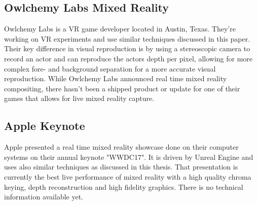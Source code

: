 \subsection{Owlchemy Labs Mixed Reality}

Owlchemy Labs is a VR game developer located in Austin, Texas. They're working 
on VR experiments and use similar techniques discussed in this paper. Their key 
difference in visual reproduction is by using a stereoscopic camera to record 
an actor and can reproduce the actors depth per pixel, allowing for more 
complex fore- and background separation for a more accurate visual reproduction.
\newline
While Owlchemy Labs announced real time mixed reality compositing, there hasn't 
been a shipped product or update for one of their games that allows for live 
mixed reality capture\cite{owlchemy:mr:3:2017}.

\subsection{Apple Keynote}

Apple presented a real time mixed reality showcase done on their computer 
systems on their annual keynote "WWDC17". It is driven by Unreal Engine and 
uses also similar techniques as discussed in this thesis. That presentation is 
currently the best live performance of mixed reality with a high quality chroma 
keying, depth reconstruction and high fidelity graphics. There is no technical 
information available yet\cite{ilmxlab:mr-demo:2017}.